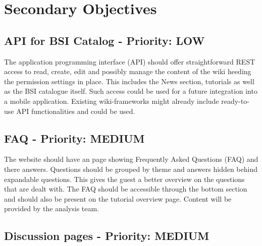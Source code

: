 \chapter{Secondary Objectives}
\section{API for BSI Catalog - Priority: LOW}
The application programming interface (API) should offer straightforward REST access to read, create, edit and possibly manage the content of the wiki heeding the permission settings in place.
This includes the News section, tutorials as well as the BSI catalogue itself.
Such access could be used for a future integration into a mobile application.
Existing wiki-frameworks might already include ready-to-use API functionalities and could be used.


\section{FAQ - Priority: MEDIUM}



\begin{tcolorbox}[breakable,colback=red!14,colframe=red!40!black,title=UPDATE 19/11/2017]
The website should have an page showing Frequently Asked Questions (FAQ) and there answers.
Questions should be grouped by theme and answers hidden behind expandable questions. 
This gives the guest a better overview on the questions that are dealt with.
The FAQ should be accessible through the bottom section and should also be present on the tutorial overview page.
Content will be provided by the analysis team.
\end{tcolorbox}


\section{Discussion pages - Priority: MEDIUM}
